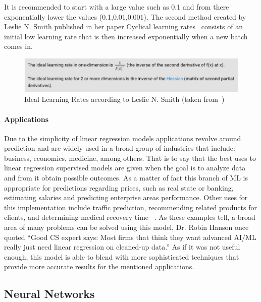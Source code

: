 It is recommended to start with a large value such as 0.1 and from there exponentially lower the values (0.1,0.01,0.001).
The second method created by Leslie N. Smith published in her paper Cyclical learning rates~\cite{leslie15} consists of an initial low learning rate that is then increased exponentially when a new batch comes in.

\begin{figure}[htbp]
  \centering
  \includegraphics[width=\textwidth]{images/learningRate}
  \caption{ Ideal Learning Rates according to Leslie N. Smith (taken from~\cite{leslie15}) }
  \label{fig:learningRate}
\end{figure}


\paragraph{Applications}

Due to the simplicity of linear regression models applications revolve around prediction and are widely used in a broad group of industries that include: business, economics, medicine, among others. That is to say that the best uses to linear regression supervised models are given when the goal is to analyze data and from it obtain possible outcomes. As a matter of fact this branch of \ac{ML} is appropriate for predictions regarding prices, such as real state or banking, estimating salaries and predicting enterprise areas performance. Other uses for this implementation include traffic prediction, recommending related products for clients, and determining medical recovery time ~\cite{grandeur17}. As these examples tell, a broad area of many problems can be solved using this model, Dr. Robin Hanson once quoted “Good CS expert says: Most firms that think they want advanced AI/ML really just need linear regression on cleaned-up data.” As if it was not useful enough, this model is able to blend with more sophisticated techniques that provide more accurate results for the mentioned applications. 



\subsection{Neural Networks}

